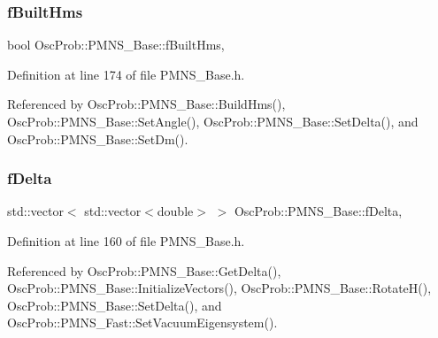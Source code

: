 \subsubsection{\texorpdfstring{f\+Built\+Hms}{fBuiltHms}}
{\footnotesize\ttfamily bool Osc\+Prob\+::\+P\+M\+N\+S\+\_\+\+Base\+::f\+Built\+Hms\hspace{0.3cm}{\ttfamily [protected]}, {\ttfamily [inherited]}}



Definition at line 174 of file P\+M\+N\+S\+\_\+\+Base.\+h.



Referenced by Osc\+Prob\+::\+P\+M\+N\+S\+\_\+\+Base\+::\+Build\+Hms(), Osc\+Prob\+::\+P\+M\+N\+S\+\_\+\+Base\+::\+Set\+Angle(), Osc\+Prob\+::\+P\+M\+N\+S\+\_\+\+Base\+::\+Set\+Delta(), and Osc\+Prob\+::\+P\+M\+N\+S\+\_\+\+Base\+::\+Set\+Dm().

\mbox{\label{classOscProb_1_1PMNS__Base_ab2a5fa40e689b221c8a7d2c17213810d}} 
\subsubsection{\texorpdfstring{f\+Delta}{fDelta}}
{\footnotesize\ttfamily std\+::vector$<$ std\+::vector$<$double$>$ $>$ Osc\+Prob\+::\+P\+M\+N\+S\+\_\+\+Base\+::f\+Delta\hspace{0.3cm}{\ttfamily [protected]}, {\ttfamily [inherited]}}



Definition at line 160 of file P\+M\+N\+S\+\_\+\+Base.\+h.



Referenced by Osc\+Prob\+::\+P\+M\+N\+S\+\_\+\+Base\+::\+Get\+Delta(), Osc\+Prob\+::\+P\+M\+N\+S\+\_\+\+Base\+::\+Initialize\+Vectors(), Osc\+Prob\+::\+P\+M\+N\+S\+\_\+\+Base\+::\+Rotate\+H(), Osc\+Prob\+::\+P\+M\+N\+S\+\_\+\+Base\+::\+Set\+Delta(), and Osc\+Prob\+::\+P\+M\+N\+S\+\_\+\+Fast\+::\+Set\+Vacuum\+Eigensystem().

\mbox{\label{classOscProb_1_1PMNS__Base_a406a31c3b5d620e5a0cace5b411f9f70}} 
